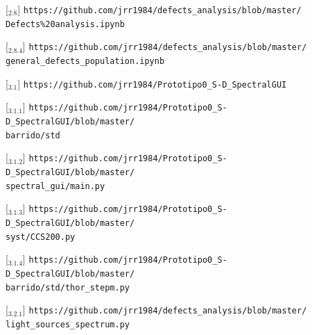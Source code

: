 [\href{https://github.com/jrr1984/defects\_analysis/blob/master/Defects\%20analysis.ipynb}{\faGithub$_{2.8}$}] \texttt{https://github.com/jrr1984/defects\_analysis/blob/master/\\\hspace{1.5cm}Defects\%20analysis.ipynb}

[\href{https://github.com/jrr1984/defects\_analysis/blob/master/general\_defects\_population.ipynb}{\faGithub$_{2.8.4}$}] \texttt{https://github.com/jrr1984/defects\_analysis/blob/master/\\\hspace{1.5cm}general\_defects\_population.ipynb}

[\href{https://github.com/jrr1984/Prototipo0\_S-D\_SpectralGUI}{\faGithub$_{3.1}$}] \texttt{https://github.com/jrr1984/Prototipo0\_S-D\_SpectralGUI}

[\href{https://github.com/jrr1984/Prototipo0\_S-D\_SpectralGUI/blob/master/barrido/std}{\faGithub$_{3.1.1}$}] \texttt{https://github.com/jrr1984/Prototipo0\_S-D\_SpectralGUI/blob/master/\\\hspace{1.5cm}barrido/std}

[\href{https://github.com/jrr1984/Prototipo0\_S-D\_SpectralGUI/blob/master/spectral\_gui/main.py}{\faGithub$_{3.1.2}$}] \texttt{https://github.com/jrr1984/Prototipo0\_S-D\_SpectralGUI/blob/master/\\\hspace{1.5cm}spectral\_gui/main.py}

[\href{https://github.com/jrr1984/Prototipo0\_S-D\_SpectralGUI/blob/master/syst/CCS200.py}{\faGithub$_{3.1.3}$}] \texttt{https://github.com/jrr1984/Prototipo0\_S-D\_SpectralGUI/blob/master/\\\hspace{1.5cm}syst/CCS200.py}

[\href{https://github.com/jrr1984/Prototipo0\_S-D\_SpectralGUI/blob/master/barrido/std/thor\_stepm.py}{\faGithub$_{3.1.4}$}] \texttt{https://github.com/jrr1984/Prototipo0\_S-D\_SpectralGUI/blob/master/\\\hspace{1.5cm}barrido/std/thor\_stepm.py}

[\href{https://github.com/jrr1984/defects\_analysis/blob/master/light\_sources\_spectrum.py}{\faGithub$_{3.2.1}$}] \texttt{https://github.com/jrr1984/defects\_analysis/blob/master/\\\hspace{1.5cm}light\_sources\_spectrum.py}

